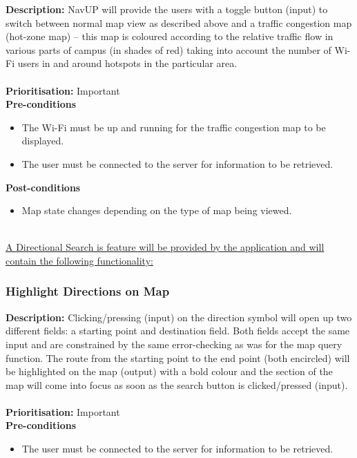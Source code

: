 \documentclass[runningheads,a4paper]{article}
\begin{document}
\textbf{Description:}  NavUP will provide the users with a toggle button (input) to switch between normal map view as described above and a traffic congestion map (hot-zone map) – this map is coloured according to the relative traffic flow in various parts of campus (in shades of red) taking into account the number of Wi-Fi users in and around hotspots in the particular area.\\\\
\noindent
\textbf{Prioritisation:} Important\\
  
  
\textbf{Pre-conditions}
\begin{itemize}
 	\item The Wi-Fi must be up and running for the traffic congestion map to be displayed.
	\item The user must be connected to the server for information to be retrieved.
\end{itemize}
  
\textbf{Post-conditions}
\begin{itemize}
  	\item Map state changes depending on the type of map being viewed.
\end{itemize}



\noindent \\ \underline{A Directional Search is feature will be provided by the application and will contain the following functionality:}


\subsubsection{Highlight Directions on Map}

\textbf{Description:}  Clicking/pressing (input) on the direction symbol will open up two different fields: a starting point and destination field. Both fields accept the same input and are constrained by the same error-checking as was for the map query function.
The route from the starting point to the end point (both encircled) will be highlighted on the map (output) with a bold colour and the section of the map will come into focus as soon as the search button is clicked/pressed (input).\\\\
\noindent
\textbf{Prioritisation:} Important\\
  
  
\textbf{Pre-conditions}
\begin{itemize}
	\item The user must be connected to the server for information to be retrieved.
\end{itemize}
  
\end{document}
